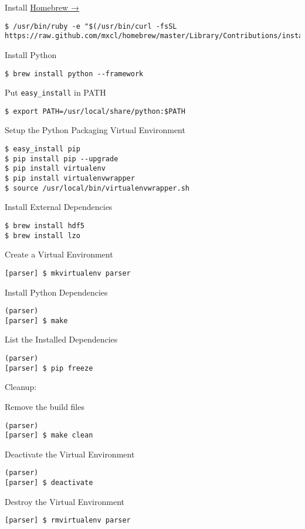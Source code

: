 Install \href{http://mxcl.github.com/homebrew/}{Homebrew →}

\begin{lstlisting}
$ /usr/bin/ruby -e "$(/usr/bin/curl -fsSL https://raw.github.com/mxcl/homebrew/master/Library/Contributions/install_homebrew.rb)"
\end{lstlisting}

Install Python

\begin{lstlisting}
$ brew install python --framework
\end{lstlisting}

Put \lstinline!easy_install! in PATH

\begin{lstlisting}
$ export PATH=/usr/local/share/python:$PATH
\end{lstlisting}

Setup the Python Packaging Virtual Environment

\begin{lstlisting}
$ easy_install pip
$ pip install pip --upgrade
$ pip install virtualenv
$ pip install virtualenvwrapper
$ source /usr/local/bin/virtualenvwrapper.sh
\end{lstlisting}

Install External Dependencies

\begin{lstlisting}
$ brew install hdf5
$ brew install lzo   
\end{lstlisting}

Create a Virtual Environment

\begin{lstlisting}
[parser] $ mkvirtualenv parser
\end{lstlisting}

Install Python Dependencies

\begin{lstlisting}
(parser)
[parser] $ make
\end{lstlisting}

List the Installed Dependencies

\begin{lstlisting}
(parser)
[parser] $ pip freeze   
\end{lstlisting}

Cleanup:

Remove the build files

\begin{lstlisting}
(parser)
[parser] $ make clean
\end{lstlisting}

Deactivate the Virtual Environment

\begin{lstlisting}
(parser)
[parser] $ deactivate
\end{lstlisting}

Destroy the Virtual Environment

\begin{lstlisting}
[parser] $ rmvirtualenv parser
\end{lstlisting}

